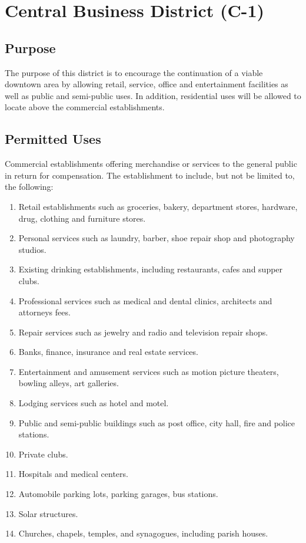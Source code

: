 
\setcounter{section}{49}
\section{Central Business District (C-1)}
\subsection{Purpose}
The purpose of this district is to encourage the continuation of a viable downtown area by allowing retail, service, office and entertainment facilities as well as public and semi-public uses.  In addition, residential uses will be allowed to locate above the commercial establishments.
\subsection{Permitted Uses}
Commercial establishments offering merchandise or services to the general public in return for compensation. The establishment to include, but not be limited to, the following:
\begin{enumerate}[{\indent}1)]
    \item Retail establishments such as groceries, bakery, department stores, hardware, drug, clothing and furniture stores.
    \item Personal services such as laundry, barber, shoe repair shop and photography studios.
    \item Existing drinking establishments, including restaurants, cafes and supper clubs.
    \item Professional services such as medical and dental clinics, architects and attorneys fees.
    \item Repair services such as jewelry and radio and television repair shops.
    \item Banks, finance, insurance and real estate services.
    \item Entertainment and amusement services such as motion picture theaters, bowling alleys, art galleries.
    \item Lodging services such as hotel and motel.
    \item Public and semi-public buildings such as post office, city hall, fire and police stations.
    \item Private clubs.
    \item Hospitals and medical centers.
    \item Automobile parking lots, parking garages, bus stations.
    \item Solar structures.
    \item Churches, chapels, temples, and synagogues, including parish houses.
\end{enumerate}
